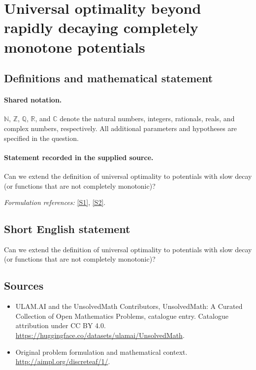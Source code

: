 \documentclass[11pt]{article}
\newcommand{\sref}[2]{\hyperlink{source:#1:#2}{[S#2]}}
\begin{document}
\section{Universal optimality beyond rapidly decaying completely monotone potentials}\label{statement}

\subsection{Definitions and mathematical statement}

\paragraph{Shared notation.}$\mathbb N$, $\mathbb Z$, $\mathbb Q$, $\mathbb R$, and $\mathbb C$ denote the natural numbers, integers, rationals, reals, and complex numbers, respectively. All additional parameters and hypotheses are specified in the question.


\paragraph{Statement recorded in the supplied source.}
Can we extend the definition of universal optimality to potentials with slow decay (or functions that are not completely monotonic)?
\par\smallskip\textit{Formulation references:} \sref{statement}{1}, \sref{statement}{2}.
\subsection{Short English statement}
Can we extend the definition of universal optimality to potentials with slow decay (or functions that are not completely monotonic)?
\subsection{Sources}
\begin{itemize}
\item[\hypertarget{source:statement:1}{S1}] ULAM.AI and the UnsolvedMath Contributors, UnsolvedMath: A Curated Collection of Open Mathematics Problems, catalogue entry. Catalogue attribution under CC BY 4.0.
\url{https://huggingface.co/datasets/ulamai/UnsolvedMath}.
\item[\hypertarget{source:statement:2}{S2}] Original problem formulation and mathematical context.
\url{http://aimpl.org/discreteaf/1/}.
\end{itemize}
\label{end:statement}
\end{document}
